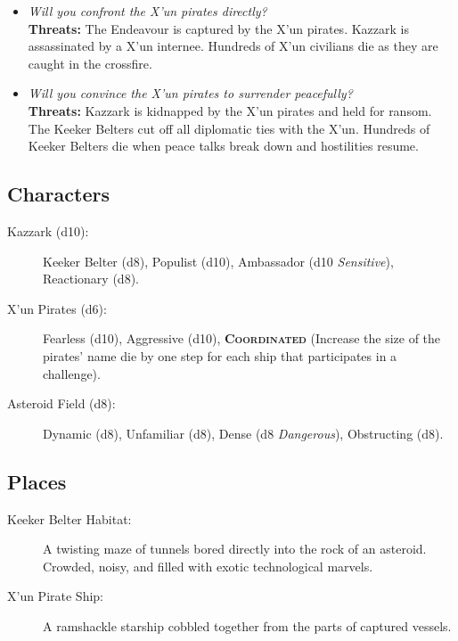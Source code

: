\documentclass[11pt, a5paper, parskip=half-, DIV=12]{scrartcl}
\begin{document}
\begin{itemize}
	\item \textit{Will you confront the X'un pirates directly?} \\ \textbf{Threats:} The Endeavour is captured by the X'un pirates. Kazzark is assassinated by a X'un internee. Hundreds of X'un civilians die as they are caught in the crossfire.
	\item \textit{Will you convince the X'un pirates to surrender peacefully?} \\ \textbf{Threats:} Kazzark is kidnapped by the X'un pirates and held for ransom. The Keeker Belters cut off all diplomatic ties with the X'un. Hundreds of Keeker Belters die when peace talks break down and hostilities resume.
\end{itemize}

\newpage

\subsection*{Characters}
\begin{description}
	\item[Kazzark (d10):] Keeker Belter (d8), Populist (d10), Ambassador (d10 \textit{Sensitive}), Reactionary (d8).
	\item[X'un Pirates (d6):] Fearless (d10), Aggressive (d10), \textbf{\textsc{Coordinated}} (Increase the size of the pirates' name die by one step for each ship that participates in a challenge).
	\item[Asteroid Field (d8):] Dynamic (d8), Unfamiliar (d8),  Dense (d8 \textit{Dangerous}), Obstructing (d8).
\end{description}

\subsection*{Places}
\begin{description}
	\item[Keeker Belter Habitat:] A twisting maze of tunnels bored directly into the rock of an asteroid. Crowded, noisy, and filled with exotic technological marvels.
	\item[X'un Pirate Ship:] A ramshackle starship cobbled together from the parts of captured vessels. 
\end{description}
\end{document}
